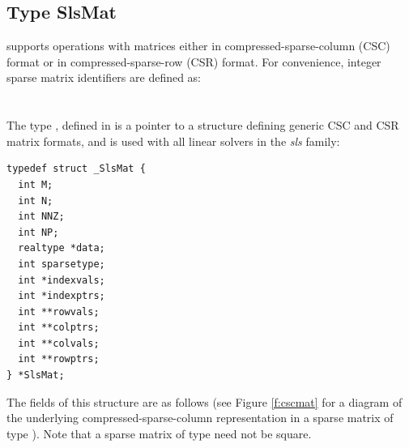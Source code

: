 \subsection{Type SlsMat}
{\sundials} supports operations with matrices either in compressed-sparse-column
(CSC) format or in compressed-sparse-row (CSR) format. For convenience,
integer sparse  matrix identifiers are defined as:\\
  \indent {}\\
  \indent {}\\
The type , defined in  is a pointer to a 
structure defining generic CSC and CSR matrix formats, and is
used with all linear solvers in the {\em sls} family:
\begin{verbatim}
typedef struct _SlsMat {
  int M;
  int N;
  int NNZ;
  int NP;
  realtype *data;
  int sparsetype;
  int *indexvals;
  int *indexptrs;
  int **rowvals;
  int **colptrs;
  int **colvals;
  int **rowptrs;
} *SlsMat;
\end{verbatim}
The fields of this structure are as follows (see Figure \ref{f:cscmat}
for a diagram of the underlying compressed-sparse-column
representation in a sparse matrix of type ).  Note that a
sparse matrix of type  need not be square.
